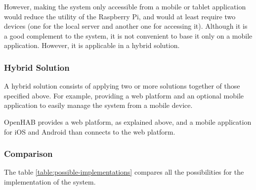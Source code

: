 However, making the system only accessible from a mobile or tablet application would reduce the utility of the Raspberry Pi, and
would at least require two devices (one for the local server and another one for accessing it). Although it is a good complement to the
system, it is not convenient to base it only on a mobile application. However, it is applicable in a hybrid solution.

\subsubsection{Hybrid Solution}
A hybrid solution consists of applying two or more solutions together of those specified above. For example, providing a web platform
and an optional mobile application to easily manage the system from a mobile device.

OpenHAB provides a web platform, as explained above, and a mobile application for iOS and Android than connects to the web platform.

\subsubsection{Comparison}
The table \ref{table:possible-implementations} compares all the possibilities for the implementation of the system.

